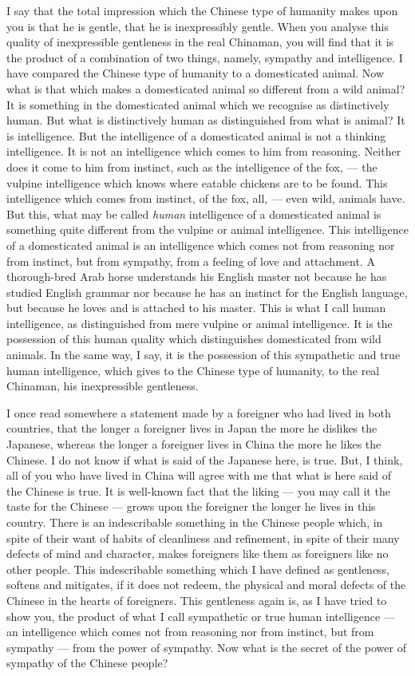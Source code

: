 I say that the total impression which the Chinese type of humanity makes upon you is that he is gentle, that he is inexpressibly gentle.
When you analyse this quality of inexpressible gentleness in the real Chinaman, you will find that it is the product of a combination of two things, namely, sympathy and intelligence.
I have compared the Chinese type of humanity to a domesticated animal.
Now what is that which makes a domesticated animal so different from a wild animal?
It is something in the domesticated animal which we recognise as distinctively human.
But what is distinctively human as distinguished from what is animal?
It is intelligence.
But the intelligence of a domesticated animal is not a thinking intelligence.
It is not an intelligence which comes to him from reasoning.
Neither does it come to him from instinct, such as the intelligence of the fox, --- the vulpine intelligence which knows where eatable chickens are to be found.
This intelligence which comes from instinct, of the fox, all, --- even wild, animals have.
But this, what may be called \emph{human} intelligence of a domesticated animal is something quite different from the vulpine or animal intelligence.
This intelligence of a domesticated animal is an intelligence which comes not from reasoning nor from instinct, but from sympathy, from a feeling of love and attachment.
A thorough-bred Arab horse understands his English master not because he has studied English grammar nor because he has an instinct for the English language, but because he loves and is attached to his master.
This is what I call human intelligence, as distinguished from mere vulpine or animal intelligence.
It is the possession of this human quality which distinguishes domesticated from wild animals.
In the same way, I say, it is the possession of this sympathetic and true human intelligence, which gives to the Chinese type of humanity, to the real Chinaman, his inexpressible gentleness.

I once read somewhere a statement made by a foreigner who had lived in both countries, that the longer a foreigner lives in Japan the more he dislikes the Japanese, whereas the longer a foreigner lives in China the more he likes the Chinese.
I do not know if what is said of the Japanese here, is true.
But, I think, all of you who have lived in China will agree with me that what is here said of the Chinese is true.
It is well-known fact that the liking --- you may call it the taste for the Chinese --- grows upon the foreigner the longer he lives in this country.
There is an indescribable something in the Chinese people which, in spite of their want of habits of cleanliness and refinement, in spite of their many defects of mind and character, makes foreigners like them as foreigners like no other people.
This indescribable something which I have defined as gentleness, softens and mitigates, if it does not redeem, the physical and moral defects of the Chinese in the hearts of foreigners.
This gentleness again is, as I have tried to show you, the product of what I call sympathetic or true human intelligence --- an intelligence which comes not from reasoning nor from instinct, but from sympathy --- from the power of sympathy.
Now what is the secret of the power of sympathy of the Chinese people?

